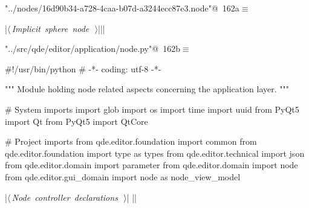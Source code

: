 \documentclass[%
    a4paper,    %
    justified,  %
    nobib,      %
    openany     %
]{tufte-book}
\begin{document}
\begin{flushleft} \small
\begin{minipage}{\linewidth}\label{scrap192}\raggedright\small
{} \verb@"../nodes/16d90b34-a728-4caa-b07d-a3244ecc87e3.node"@\nobreak\ {\footnotesize {162a}}$\equiv$
\vspace{-1ex}
\begin{pythoncode}
|\hbox{$\langle\,${\itshape Implicit sphere node}\nobreak\ {\footnotesize {}}$\,\rangle$}||\NWsep|
\end{pythoncode}
\vspace{1.5ex}
\footnotesize
\begin{list}{}{\setlength{\itemsep}{-\parsep}\setlength{\itemindent}{-\leftmargin}}

\item{}
\end{list}
\end{minipage}\vspace{4ex}
\end{flushleft}
\begin{flushleft} \small
\begin{minipage}{\linewidth}\label{scrap193}\raggedright\small
{} \verb@"../src/qde/editor/application/node.py"@\nobreak\ {\footnotesize {162b}}$\equiv$
\vspace{-1ex}
\begin{pythoncode}
#!/usr/bin/python
# -*- coding: utf-8 -*-

""" Module holding node related aspects concerning the application layer.
"""

# System imports
import glob
import os
import time
import uuid
from PyQt5 import Qt
from PyQt5 import QtCore

# Project imports
from qde.editor.foundation import common
from qde.editor.foundation import type as types
from qde.editor.technical  import json
from qde.editor.domain     import parameter
from qde.editor.domain     import node
from qde.editor.gui_domain import node as node_view_model


|\hbox{$\langle\,${\itshape Node controller declarations}\nobreak\ {\footnotesize {}}$\,\rangle$}|
|\NWsep|
\end{pythoncode}
\vspace{1.5ex}
\footnotesize
\begin{list}{}{\setlength{\itemsep}{-\parsep}\setlength{\itemindent}{-\leftmargin}}

\item{}
\end{list}
\end{minipage}\vspace{4ex}
\end{flushleft}
\end{document}

